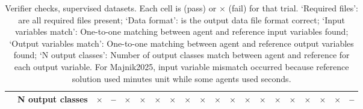 \begin{table}[t]
\begin{tabular}{l l rrr rrr rrr rrr rrr rrr}
 & N output classes & \textcolor{red!70!black}{$\times$} & -- & \textcolor{red!70!black}{$\times$} & \textcolor{red!70!black}{$\times$} & \textcolor{red!70!black}{$\times$} & \textcolor{red!70!black}{$\times$} & \textcolor{red!70!black}{$\times$} & \textcolor{red!70!black}{$\times$} & \textcolor{red!70!black}{$\times$} & \textcolor{red!70!black}{$\times$} & \textcolor{red!70!black}{$\times$} & \textcolor{red!70!black}{$\times$} & \textcolor{red!70!black}{$\times$} & \textcolor{red!70!black}{$\times$} & \textcolor{red!70!black}{$\times$} & \textcolor{red!70!black}{$\times$} & \textcolor{red!70!black}{$\times$} & -- \\
\bottomrule
\end{tabular}
\caption{Verifier checks, supervised datasets. Each cell is \checkmark (pass) or $\times$ (fail) for that trial. `Required files': are all required files present; `Data format': is the output data file format correct; `Input variables match': One-to-one matching between agent and reference input variables found;  `Output variables match': One-to-one matching between agent and reference output variables found;  `N output classes': Number of output classes match between agent and reference for each output variable. For Majnik2025, input variable mismatch occurred because reference solution used minutes unit while some agents used seconds. }
\label{tab:checks-supervised}
\end{table}
